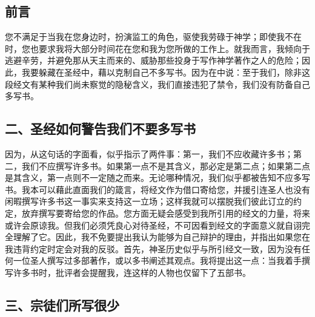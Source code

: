 
\subsection{前言}

您不满足于当我在您身边时，扮演监工的角色，驱使我劳碌于神学；即使我不在时，您也要求我将大部分时间花在您和我为您所做的工作上。就我而言，我倾向于逃避辛劳，并避免那从天主而来的、威胁那些投身于写作神学著作之人的危险；因此，我要躲藏在圣经中，藉以克制自己不多写书。因为在中说：至于我们，除非这段经文有某种我们尚未察觉的隐秘含义，我们直接违犯了禁令，我们没有防备自己多写书。\par

\par


\subsection{二、圣经如何警告我们不要多写书}

因为，从这句话的字面看，似乎指示了两件事：第一，我们不应收藏许多书；第二，我们不应撰写许多书。如果第一点不是其含义，那必定是第二点；如果第二点是其含义，第一点则不一定随之而来。无论哪种情况，我们似乎都被告知不应多写书。我本可以藉此直面我们的箴言，将经文作为借口寄给您，并援引连圣人也没有闲暇撰写许多书这一事实来支持这一立场；这样我就可以摆脱我们彼此订立的约定，放弃撰写要寄给您的作品。您方面无疑会感受到我所引用的经文的力量，将来或许会原谅我。但我们必须凭良心对待圣经，不可因看到经文的字面意义就自诩完全理解了它。因此，我不免要提出我认为能够为自己辩护的理由，并指出如果您在我违背约定时定会对我的反驳。首先，神圣历史似乎与所引经文一致，因为没有任何一位圣人撰写过多部著作，或以多书阐述其观点。我将提出这一点：当我着手撰写许多书时，批评者会提醒我，连这样的人物也仅留下了五部书。\par


\subsection{三、宗徒们所写很少}

